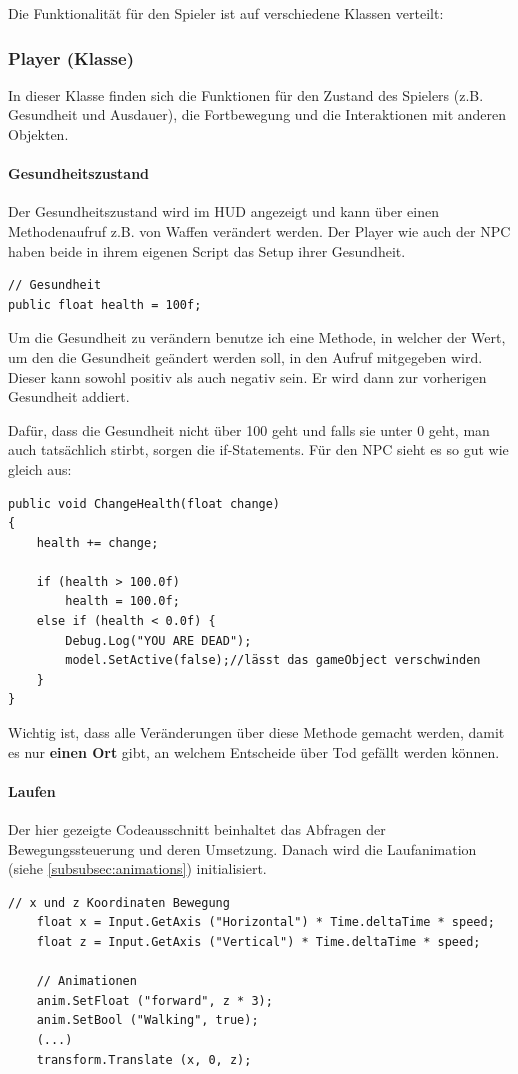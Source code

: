 Die Funktionalität für den Spieler ist auf verschiedene Klassen verteilt:

\subsubsection{Player (Klasse)}
In dieser Klasse finden sich die Funktionen für den Zustand des Spielers (z.B. Gesundheit und Ausdauer), die Fortbewegung und die Interaktionen mit anderen Objekten.

\paragraph{Gesundheitszustand}
Der Gesundheitszustand wird im HUD angezeigt und kann über einen Methodenaufruf z.B. von Waffen verändert werden.
Der Player wie auch der NPC haben beide in ihrem eigenen Script das Setup ihrer Gesundheit.
\begin{lstlisting}[caption={Gesundheit als öffentliche Variable}]
// Gesundheit
public float health = 100f;
\end{lstlisting}
Um die Gesundheit zu verändern benutze ich eine Methode, in welcher der Wert, um den die Gesundheit geändert werden soll, in den Aufruf mitgegeben wird. Dieser kann sowohl positiv als auch negativ sein.
Er wird dann zur vorherigen Gesundheit addiert.

Dafür, dass die Gesundheit nicht über 100 geht und falls sie unter 0 geht, man auch tatsächlich stirbt, sorgen die if-Statements. Für den NPC sieht es so gut wie gleich aus:
\begin{lstlisting}
public void ChangeHealth(float change)
{
	health += change;

	if (health > 100.0f)
		health = 100.0f;
	else if (health < 0.0f) {
		Debug.Log("YOU ARE DEAD");
		model.SetActive(false);//lässt das gameObject verschwinden
	}
}
\end{lstlisting}
Wichtig ist, dass alle Veränderungen über diese Methode gemacht werden, damit es nur \textbf{einen Ort} gibt, an welchem Entscheide über Tod gefällt werden können.

\paragraph{Laufen}
Der hier gezeigte Codeausschnitt beinhaltet das Abfragen der Bewegungssteuerung und deren Umsetzung.
Danach wird die Laufanimation (siehe \cref{subsubsec:animations}) initialisiert.

\begin{lstlisting}[caption={Laufen}]
	// x und z Koordinaten Bewegung
	float x = Input.GetAxis ("Horizontal") * Time.deltaTime * speed;
	float z = Input.GetAxis ("Vertical") * Time.deltaTime * speed;
        
	// Animationen
	anim.SetFloat ("forward", z * 3);
	anim.SetBool ("Walking", true);
	(...)
	transform.Translate (x, 0, z);
\end{lstlisting}

